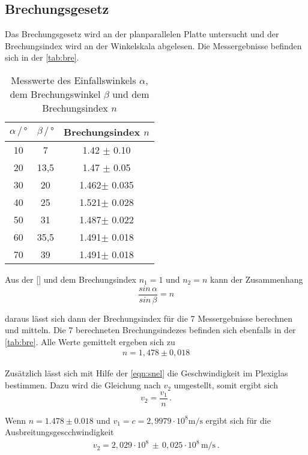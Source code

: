 \subsection{Brechungsgesetz}
Das Brechungsgesetz wird an der planparallelen Platte untersucht und der Brechungsindex wird an der Winkelskala abgelesen. Die Messergebnisse befinden sich in der \autoref{tab:bre}. 
\begin{table}
    \centering
    \caption{Messwerte des Einfallswinkels $\alpha$, dem Brechungswinkel $\beta$ und dem Brechungsindex $n$}
    \label{tab:bre}
    \begin{tabular}{c c c}
    \toprule
         $\alpha \, / \, ° $ & $\beta \, / \, °$ & Brechungsindex $n$\\
    \midrule
    10 & 7    & 1.42 $\pm$ 0.10\\
    20 & 13,5 & 1.47 $\pm$ 0.05\\
    30 & 20   & 1.462$\pm$ 0.035\\
    40 & 25   & 1.521$\pm$ 0.028\\
    50 & 31   & 1.487$\pm$ 0.022\\
    60 & 35,5 & 1.491$\pm$ 0.018\\
    70 & 39   & 1.491$\pm$ 0.018\\
    \bottomrule
    \end{tabular}
\end{table}

\noindent
Aus der \autoref{} und dem Brechungsindex $n_1 = 1$ und $n_2 = n$ kann der Zusammenhang 
\begin{equation}
    \frac{sin \, \alpha}{sin \, \beta} = n
\end{equation}

\noindent
daraus lässt sich dann der Brechungsindex für die 7 Messergebnisse berechnen und mitteln. Die 7 berechneten Brechungsindezes befinden sich ebenfalls in der \autoref{tab:bre}.
Alle Werte gemittelt ergeben sich zu 
\begin{align*}
    n = 1,478 \pm 0,018
\end{align*} 

Zusätzlich lässt sich mit Hilfe der \autoref{eqn:snel} die Geschwindigkeit im Plexiglas bestimmen. Dazu wird die Gleichung nach $v_2$ umgestellt, somit ergibt sich
\begin{equation}
    v_2 = \frac{v_1}{n} \, .
\end{equation}

\noindent
Wenn $n = 1.478 \pm 0.018$ und $v_1 = c = 2,9979 \cdot 10^8 \si{\meter\per\second}$ ergibt sich für die Ausbreitungsgescchwindigkeit
\begin{align*}
    v_2 = 2,029 \cdot 10^8 \, \pm \, 0,025 \cdot 10^8 \, \si{\meter\per\second} \, .
\end{align*}

